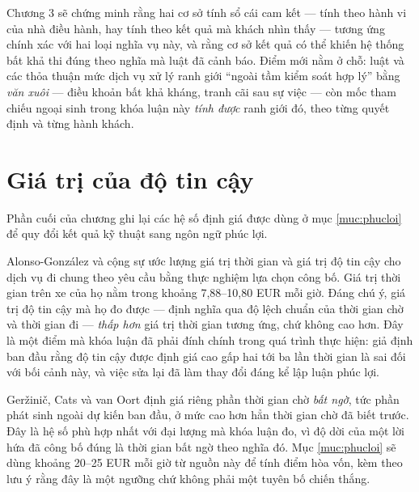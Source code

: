 Chương 3 sẽ chứng minh rằng hai cơ sở tính sổ cái cam kết --- tính theo hành vi của nhà điều
hành, hay tính theo kết quả mà khách nhìn thấy --- tương ứng chính xác với hai loại nghĩa vụ
này, và rằng cơ sở kết quả có thể khiến hệ thống bất khả thi đúng theo nghĩa mà luật đã cảnh
báo. Điểm mới nằm ở chỗ: luật và các thỏa thuận mức dịch vụ xử lý ranh giới ``ngoài tầm kiểm
soát hợp lý'' bằng \emph{văn xuôi} --- điều khoản bất khả kháng, tranh cãi sau sự việc --- còn
mốc tham chiếu ngoại sinh trong khóa luận này \emph{tính được} ranh giới đó, theo từng quyết
định và từng hành khách.

\section{Giá trị của độ tin cậy}

Phần cuối của chương ghi lại các hệ số định giá được dùng ở mục \ref{muc:phucloi} để quy đổi kết quả kỹ thuật
sang ngôn ngữ phúc lợi.

Alonso-González và cộng sự \cite{alonsogonzalez2020} ước lượng giá trị thời gian và giá trị độ
tin cậy cho dịch vụ đi chung theo yêu cầu bằng thực nghiệm lựa chọn công bố. Giá trị thời gian
trên xe của họ nằm trong khoảng 7{,}88--10{,}80 EUR mỗi giờ. Đáng chú ý, giá trị độ tin cậy mà
họ đo được --- định nghĩa qua độ lệch chuẩn của thời gian chờ và thời gian đi --- \emph{thấp
hơn} giá trị thời gian tương ứng, chứ không cao hơn. Đây là một điểm mà khóa luận đã phải đính
chính trong quá trình thực hiện: giả định ban đầu rằng độ tin cậy được định giá cao gấp hai tới
ba lần thời gian là sai đối với bối cảnh này, và việc sửa lại đã làm thay đổi đáng kể lập luận
phúc lợi.

Geržinič, Cats và van Oort \cite{gerzinic2023} định giá riêng phần thời gian chờ \emph{bất ngờ},
tức phần phát sinh ngoài dự kiến ban đầu, ở mức cao hơn hẳn thời gian chờ đã biết trước. Đây là
hệ số phù hợp nhất với đại lượng mà khóa luận đo, vì độ dời của một lời hứa đã công bố đúng là
thời gian bất ngờ theo nghĩa đó. Mục \ref{muc:phucloi} sẽ dùng khoảng 20--25 EUR mỗi giờ từ nguồn này để tính
điểm hòa vốn, kèm theo lưu ý rằng đây là một ngưỡng chứ không phải một tuyên bố chiến thắng.
